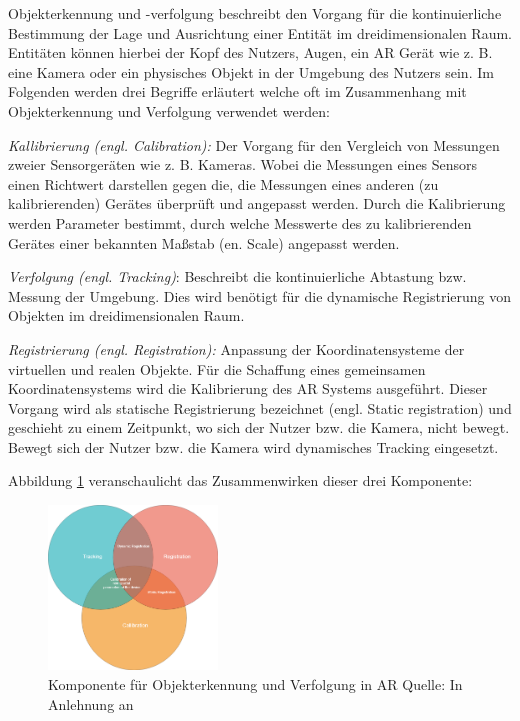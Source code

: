 Objekterkennung und -verfolgung beschreibt den Vorgang für die kontinuierliche Bestimmung der Lage und Ausrichtung einer Entität im dreidimensionalen Raum. 
Entitäten können hierbei der Kopf des Nutzers, Augen, ein AR Gerät wie z. B. eine Kamera oder ein physisches Objekt in der Umgebung des Nutzers sein. 
Im Folgenden werden drei Begriffe erläutert welche oft im Zusammenhang mit Objekterkennung und Verfolgung verwendet werden:\cite[S.~85]{DieterSchmalstieg2016}
 
\textit{Kallibrierung (engl. Calibration):} Der Vorgang für den Vergleich von Messungen zweier Sensorgeräten wie z. B. Kameras. Wobei die Messungen eines Sensors einen Richtwert darstellen gegen die, die
Messungen eines anderen (zu kalibrierenden) Gerätes überprüft und angepasst werden. Durch die Kalibrierung werden Parameter bestimmt, durch welche Messwerte des zu kalibrierenden Gerätes einer bekannten 
Maßstab (en. Scale) angepasst werden. \cite[S.~86]{DieterSchmalstieg2016} 

\textit{Verfolgung (engl. Tracking)}: Beschreibt die kontinuierliche Abtastung bzw. Messung der Umgebung. Dies wird benötigt für die dynamische Registrierung von Objekten im dreidimensionalen Raum. \cite[S.~86]{DieterSchmalstieg2016} 

\textit{Registrierung (engl. Registration):} Anpassung der Koordinatensysteme der virtuellen und realen Objekte. Für die Schaffung eines gemeinsamen Koordinatensystems wird die Kalibrierung des AR Systems 
ausgeführt. Dieser Vorgang wird als statische Registrierung bezeichnet (engl. Static registration) und geschieht zu einem Zeitpunkt, wo sich der Nutzer bzw. die Kamera, nicht bewegt. Bewegt sich der 
Nutzer bzw. die Kamera wird dynamisches Tracking eingesetzt. \cite[S.~86]{DieterSchmalstieg2016} 

Abbildung \ref{img:komponentsoftracking} veranschaulicht das Zusammenwirken dieser drei Komponente:

\begin{figure}[H]
	\centering
	\includegraphics[width=0.4\textwidth]{resources/fundamentals/Tracking.png}
	\caption{Komponente für Objekterkennung und Verfolgung in AR Quelle: In Anlehnung an \cite[S.~86]{DieterSchmalstieg2016}}
	\label{img:komponentsoftracking}
\end{figure}


